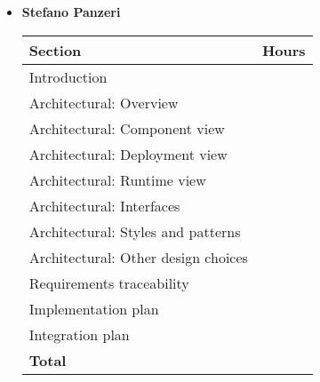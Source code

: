 \begin{itemize}
\item \textbf{Stefano Panzeri}

\begin{table}[!h]
	\centering
	\begin{tabular}{|l|l|}
		\hline
		\textbf{Section}														&		\textbf{Hours}  \\ \hline
		Introduction														&  		\\ \hline
		Architectural: Overview						& 		 	\\ \hline
		Architectural: Component view						& 		 	\\ \hline
		Architectural: Deployment view						& 		 	\\ \hline
		Architectural: Runtime view						& 		 	\\ \hline
		Architectural: Interfaces						& 		 	\\ \hline
		Architectural: Styles and patterns					& 		 	\\ \hline
		Architectural: Other design choices					& 		 	\\ \hline
		Requirements traceability					& 		 	\\ \hline
		Implementation plan					& 		 	\\ \hline
		Integration plan					& 		 	\\ \hline
		\textbf{Total}															&  	\\ \hline
	\end{tabular}
\end{table}

\end{itemize}
